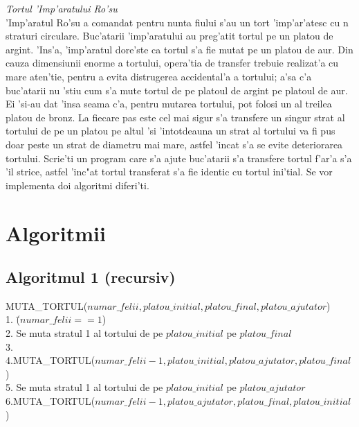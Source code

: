\documentclass{article}
\begin{document}
\emph {Tortul 'Imp'aratului Ro'su} \\

'Imp'aratul Ro'su a comandat pentru nunta fiului s'au un tort 'imp'ar'atesc cu n straturi 
circulare. Buc'atarii 'imp'aratului au preg'atit tortul pe un platou de argint. 'Ins'a, 'imp'aratul dore'ste ca tortul s'a fie mutat pe un platou de aur. Din cauza dimensiunii enorme a tortului, opera'tia de transfer trebuie realizat'a cu mare aten'tie, pentru a evita distrugerea accidental'a a tortului; a'sa c'a buc'atarii nu 'stiu cum s'a mute tortul de pe platoul de argint pe platoul de aur. Ei 'si-au dat 'insa seama c'a, pentru mutarea tortului, pot folosi un al treilea platou de bronz. La fiecare pas este cel mai sigur s'a transfere un singur strat al tortului de pe un platou pe altul 'si 'intotdeauna un strat al tortului va fi pus doar peste un strat de diametru mai mare, astfel 'incat s'a se evite deteriorarea tortului. Scrie'ti un program care s'a ajute buc'atarii s'a transfere tortul f'ar'a s'a 'il strice, astfel 'inc"at tortul transferat s'a fie identic cu tortul ini'tial.
Se vor implementa doi algoritmi diferi'ti.

\section{Algoritmii}

\subsection{Algoritmul 1 (recursiv)}
\begin{center}
\begin{tabbing}

MUTA\_TORTUL($numar\_felii, platou\_initial, platou\_final, platou\_ajutator$)\\
1. \= ($numar\_felii == 1$) \\
2.\indent           {} Se muta stratul 1 al tortului de pe $platou\_initial$ pe $platou\_final$\\ 
3.\= \\
4.\indent           \>MUTA\_TORTUL($numar\_felii-1, platou\_initial, platou\_ajutator, platou\_final$) \\
5.\indent           {}  Se muta stratul 1 al tortului de pe $platou\_initial$ pe $platou\_ajutator$\\ 6.\indent           \>MUTA\_TORTUL($numar\_felii-1, platou\_ajutator, platou\_final, platou\_initial$) \\
\end{tabbing}
\end{center}
\end{document}
